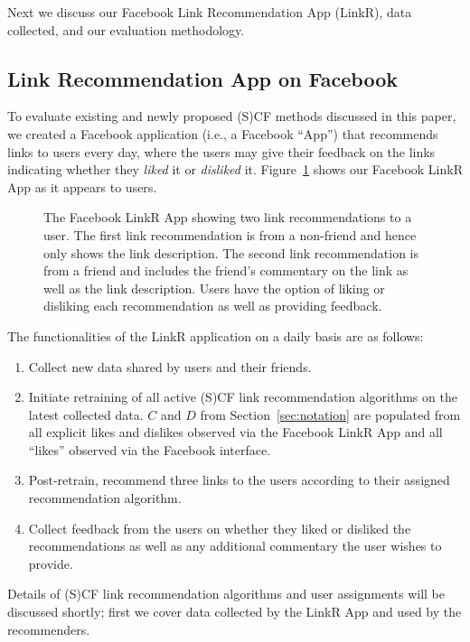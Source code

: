 Next we discuss our Facebook Link Recommendation
App (LinkR), data collected, and our evaluation methodology.

\subsection{Link Recommendation App on Facebook}

To evaluate existing and newly proposed (S)CF methods discussed in
this paper, we created a Facebook application (i.e., a Facebook
``App'') that recommends links to users every day, where the users may
give their feedback on the links indicating whether they \emph{liked}
it or \emph{disliked} it.  Figure~\ref{fig:linkr_app} shows 
our Facebook LinkR App as it appears to users.

\begin{figure}[t!]
\hspace{-2mm} 
\vspace{-8mm}
\caption{The Facebook LinkR App showing two link recommendations to a 
user.  The first link recommendation is from a non-friend and hence only
shows the link description.  
The second link recommendation is from a
friend and includes the friend's commentary on the link as well as the
link description.  
Users have the option of liking or disliking each
recommendation as well as providing feedback.}
\label{fig:linkr_app}
\vspace{-2mm}
\end{figure}

The functionalities of the LinkR application on a daily basis are as follows:
\begin{enumerate}
\item{Collect new data shared by users and their friends.}
\item{Initiate retraining of all active (S)CF link recommendation algorithms on the latest collected data.  $C$ and $D$ from Section~\ref{sec:notation}
are populated from 
all explicit likes and dislikes observed via the Facebook LinkR App
and all ``likes'' observed via the Facebook interface.}
\item{Post-retrain, recommend three links to the users according to their assigned recommendation algorithm.}
\item{Collect feedback from the users on whether they liked or disliked the recommendations as well as any additional commentary the user wishes to provide.}
\end{enumerate}
Details of (S)CF link recommendation algorithms and user assignments
will be discussed shortly; first we cover data
collected by the LinkR App and used by the recommenders.

